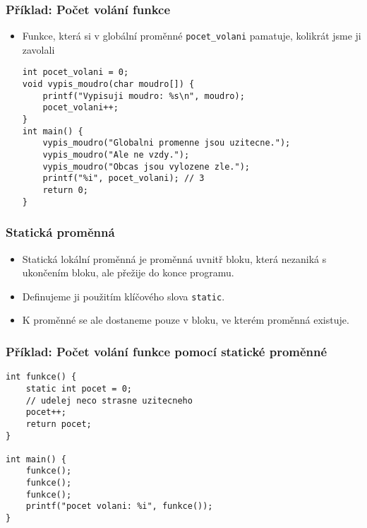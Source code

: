 \documentclass{beamer}
\newenvironment{itemizex}%
  {\large \begin{itemize}%
    \setlength{\itemsep}{8pt}%
    \setlength{\parskip}{8pt}}%
  {\end{itemize}}
\begin{document}
\begin{frame}[t,fragile]\frametitle{Příklad: Počet volání funkce} 
    \begin{itemize}
        \item Funkce, která si v globální proměnné \texttt{pocet\_volani} pamatuje, kolikrát jsme ji zavolali
        \begin{verbatim} 
int pocet_volani = 0;
void vypis_moudro(char moudro[]) {
    printf("Vypisuji moudro: %s\n", moudro);
    pocet_volani++;
}
int main() {
    vypis_moudro("Globalni promenne jsou uzitecne.");
    vypis_moudro("Ale ne vzdy.");
    vypis_moudro("Obcas jsou vylozene zle.");
    printf("%i", pocet_volani); // 3
    return 0;
}
        \end{verbatim}
    \end{itemize}
\end{frame}


\begin{frame}[t,fragile]\frametitle{Statická proměnná} 
    \begin{itemizex}
        \item Statická lokální proměnná je proměnná uvnitř bloku, která nezaniká s ukončením bloku, ale přežije do konce programu.
        \item Definujeme ji použitím klíčového slova \texttt{static}.
        \item K proměnné se ale dostaneme pouze v bloku, ve kterém proměnná existuje.
    \end{itemizex}
\end{frame}


\begin{frame}[t,fragile]\frametitle{Příklad: Počet volání funkce pomocí statické proměnné} 
    \begin{verbatim} 
int funkce() {
    static int pocet = 0;
    // udelej neco strasne uzitecneho
    pocet++;
    return pocet;
}

int main() {
    funkce();
    funkce();
    funkce();
    printf("pocet volani: %i", funkce());
}
    \end{verbatim}
\end{frame}
\end{document}
